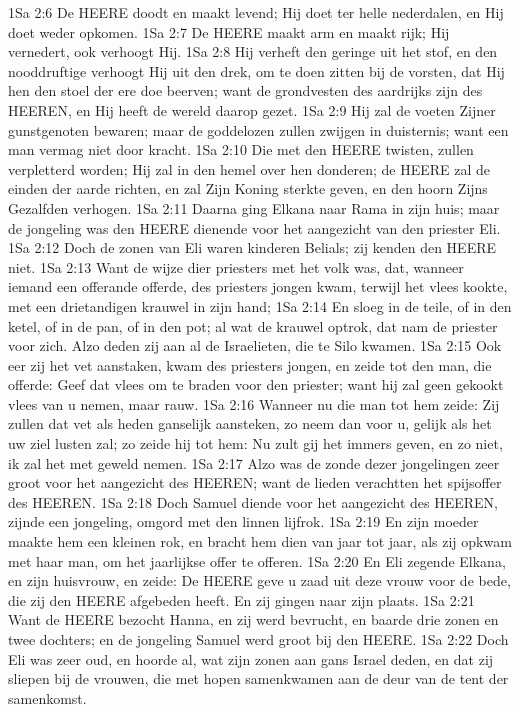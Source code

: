 1Sa 2:6  De HEERE doodt en maakt levend; Hij doet ter helle nederdalen, en Hij doet weder opkomen.
1Sa 2:7  De HEERE maakt arm en maakt rijk; Hij vernedert, ook verhoogt Hij.
1Sa 2:8  Hij verheft den geringe uit het stof, en den nooddruftige verhoogt Hij uit den drek, om te doen zitten bij de vorsten, dat Hij hen den stoel der ere doe beerven; want de grondvesten des aardrijks zijn des HEEREN, en Hij heeft de wereld daarop gezet.
1Sa 2:9  Hij zal de voeten Zijner gunstgenoten bewaren; maar de goddelozen zullen zwijgen in duisternis; want een man vermag niet door kracht.
1Sa 2:10  Die met den HEERE twisten, zullen verpletterd worden; Hij zal in den hemel over hen donderen; de HEERE zal de einden der aarde richten, en zal Zijn Koning sterkte geven, en den hoorn Zijns Gezalfden verhogen.
1Sa 2:11  Daarna ging Elkana naar Rama in zijn huis; maar de jongeling was den HEERE dienende voor het aangezicht van den priester Eli.
1Sa 2:12  Doch de zonen van Eli waren kinderen Belials; zij kenden den HEERE niet.
1Sa 2:13  Want de wijze dier priesters met het volk was, dat, wanneer iemand een offerande offerde, des priesters jongen kwam, terwijl het vlees kookte, met een drietandigen krauwel in zijn hand;
1Sa 2:14  En sloeg in de teile, of in den ketel, of in de pan, of in den pot; al wat de krauwel optrok, dat nam de priester voor zich. Alzo deden zij aan al de Israelieten, die te Silo kwamen.
1Sa 2:15  Ook eer zij het vet aanstaken, kwam des priesters jongen, en zeide tot den man, die offerde: Geef dat vlees om te braden voor den priester; want hij zal geen gekookt vlees van u nemen, maar rauw.
1Sa 2:16  Wanneer nu die man tot hem zeide: Zij zullen dat vet als heden ganselijk aansteken, zo neem dan voor u, gelijk als het uw ziel lusten zal; zo zeide hij tot hem: Nu zult gij het immers geven, en zo niet, ik zal het met geweld nemen.
1Sa 2:17  Alzo was de zonde dezer jongelingen zeer groot voor het aangezicht des HEEREN; want de lieden verachtten het spijsoffer des HEEREN.
1Sa 2:18  Doch Samuel diende voor het aangezicht des HEEREN, zijnde een jongeling, omgord met den linnen lijfrok.
1Sa 2:19  En zijn moeder maakte hem een kleinen rok, en bracht hem dien van jaar tot jaar, als zij opkwam met haar man, om het jaarlijkse offer te offeren.
1Sa 2:20  En Eli zegende Elkana, en zijn huisvrouw, en zeide: De HEERE geve u zaad uit deze vrouw voor de bede, die zij den HEERE afgebeden heeft. En zij gingen naar zijn plaats.
1Sa 2:21  Want de HEERE bezocht Hanna, en zij werd bevrucht, en baarde drie zonen en twee dochters; en de jongeling Samuel werd groot bij den HEERE.
1Sa 2:22  Doch Eli was zeer oud, en hoorde al, wat zijn zonen aan gans Israel deden, en dat zij sliepen bij de vrouwen, die met hopen samenkwamen aan de deur van de tent der samenkomst.
